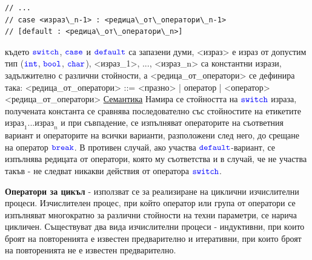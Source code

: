 \documentclass{article}
\begin{document}
\begin{itemize}
\begin{lstlisting}[style=cpp]
// ...
// case <израз\_n-1> : <редица\_от\_оператори\_n-1>
// [default : <редица\_от\_оператори\_n>]
\end{lstlisting}
където $\textcolor{blue}{\texttt{switch}}$, $\textcolor{blue}{\texttt{case}}$ и $\textcolor{blue}{\texttt{default}}$ са запазени думи, <израз> е израз от допустим тип ($\textcolor{blue}{\texttt{int}}$, $\textcolor{blue}{\texttt{bool}}$, $\textcolor{blue}{\texttt{char}}$),
<израз\_1>, ..., <израз\_n> са константни изрази, задължително с различни стойности, а <редица\_от\_оператори> се дефинира така: \newline
<редица\_от\_оператори> ::= <празно> | оператор \newline | <оператор><редица\_от\_оператори> \newline
\underline{Семантика} \newline
Намира се стойността на $\textcolor{blue}{\texttt{switch}}$ израза, получената константа се сравнява последователно със стойностите на етикетите $\text{израз}_1...
\text{израз}_n$ и при съвпадение, се изпълняват операторите на съответния вариант и операторите на всички варианти, разположени
след него, до срещане на оператор $\textcolor{blue}{\texttt{break}}$. В противен случай, ако участва $\textcolor{blue}{\texttt{default}}$-вариант, се изпълнява редицата от оператори,
която му съответства и в случай, че не участва такъв - не следват никакви действия от оператора $\textcolor{blue}{\texttt{switch}}$.
\end{itemize}
\textbf{Оператори за цикъл} - използват се за реализиране на циклични изчислителни процеси. Изчислителен процес, при който оператор или
група от оператори се изпълняват многократно за различни стойности на техни параметри, се нарича цикличен. Съществуват два вида
изчислителни процеси - индуктивни, при които броят на повторенията е известен предварително и итеративни, при които броят на
повторенията не е известен предварително.
\end{document}
